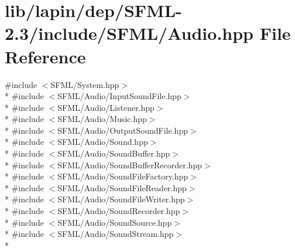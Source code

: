 \hypertarget{lapin_2dep_2_s_f_m_l-2_83_2include_2_s_f_m_l_2_audio_8hpp}{\section{lib/lapin/dep/\-S\-F\-M\-L-\/2.3/include/\-S\-F\-M\-L/\-Audio.hpp File Reference}
\label{lapin_2dep_2_s_f_m_l-2_83_2include_2_s_f_m_l_2_audio_8hpp}
}
{\ttfamily \#include $<$S\-F\-M\-L/\-System.\-hpp$>$}\\*
{\ttfamily \#include $<$S\-F\-M\-L/\-Audio/\-Input\-Sound\-File.\-hpp$>$}\\*
{\ttfamily \#include $<$S\-F\-M\-L/\-Audio/\-Listener.\-hpp$>$}\\*
{\ttfamily \#include $<$S\-F\-M\-L/\-Audio/\-Music.\-hpp$>$}\\*
{\ttfamily \#include $<$S\-F\-M\-L/\-Audio/\-Output\-Sound\-File.\-hpp$>$}\\*
{\ttfamily \#include $<$S\-F\-M\-L/\-Audio/\-Sound.\-hpp$>$}\\*
{\ttfamily \#include $<$S\-F\-M\-L/\-Audio/\-Sound\-Buffer.\-hpp$>$}\\*
{\ttfamily \#include $<$S\-F\-M\-L/\-Audio/\-Sound\-Buffer\-Recorder.\-hpp$>$}\\*
{\ttfamily \#include $<$S\-F\-M\-L/\-Audio/\-Sound\-File\-Factory.\-hpp$>$}\\*
{\ttfamily \#include $<$S\-F\-M\-L/\-Audio/\-Sound\-File\-Reader.\-hpp$>$}\\*
{\ttfamily \#include $<$S\-F\-M\-L/\-Audio/\-Sound\-File\-Writer.\-hpp$>$}\\*
{\ttfamily \#include $<$S\-F\-M\-L/\-Audio/\-Sound\-Recorder.\-hpp$>$}\\*
{\ttfamily \#include $<$S\-F\-M\-L/\-Audio/\-Sound\-Source.\-hpp$>$}\\*
{\ttfamily \#include $<$S\-F\-M\-L/\-Audio/\-Sound\-Stream.\-hpp$>$}\\*
